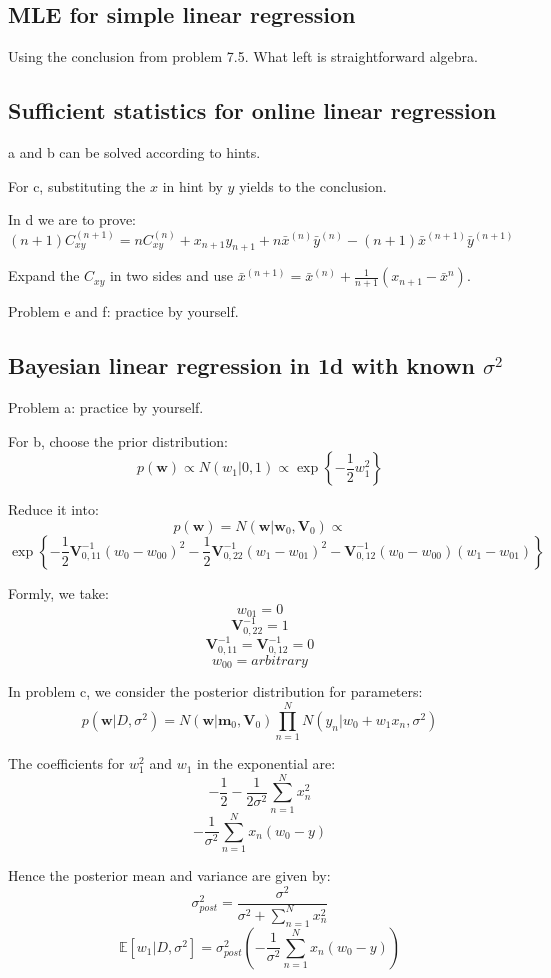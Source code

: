 \documentclass[UTF8]{ctexart}
\begin{document}
\subsection{MLE for simple linear regression}
Using the conclusion from problem 7.5. What left is straightforward algebra.

\subsection{Sufficient statistics for online linear regression}
a and b can be solved according to hints.

For c, substituting the $x$ in hint by $y$ yields to the conclusion.

In d we are to prove:
$$(n+1)C_{xy}^{(n+1)}=nC_{xy}^{(n)}+x_{n+1}y_{n+1}+n\bar{x}^{(n)}\bar{y}^{(n)}-(n+1)\bar{x}^{(n+1)}\bar{y}^{(n+1)}$$

Expand the $C_{xy}$ in two sides and use $\bar{x}^{(n+1)}=\bar{x}^{(n)}+\frac{1}{n+1}(x_{n+1}-\bar{x}^{n})$. 

Problem e and f: practice by yourself.

\subsection{Bayesian linear regression in 1d with known $\sigma^{2}$}
Problem a: practice by yourself.

For b, choose the prior distribution:
$$p(\textbf{w}) \propto N(w_{1}|0,1) \propto \exp\left\{ -\frac{1}{2}w_{1}^{2} \right\}$$

Reduce it into:
$$p(\textbf{w})=N(\textbf{w}|\textbf{w}_{0},\textbf{V}_{0}) \propto $$
$$\exp\left\{ -\frac{1}{2}\textbf{V}_{0,11}^{-1}(w_{0}-w_{00})^{2} - \frac{1}{2}\textbf{V}^{-1}_{0,22}(w_{1}-w_{01})^{2} -\textbf{V}^{-1}_{0,12}(w_{0}-w_{00})(w_{1}-w_{01})\right\}$$

Formly, we take:
$$w_{01}=0$$
$$\textbf{V}_{0,22}^{-1}=1$$
$$\textbf{V}_{0,11}^{-1}=\textbf{V}_{0,12}^{-1}=0$$
$$w_{00}=arbitrary$$

In problem c, we consider the posterior distribution for parameters:
$$p(\textbf{w}|D,\sigma^{2}) =N(\textbf{w}|\textbf{m}_{0},\textbf{V}_{0})\prod_{n=1}^{N}N(y_{n}|w_{0}+w_{1}x_{n},\sigma^{2})$$

The coefficients for $w_{1}^{2}$ and $w_{1}$ in the exponential are:
$$-\frac{1}{2}-\frac{1}{2\sigma^{2}}\sum_{n=1}^{N}x_{n}^{2}$$
$$-\frac{1}{\sigma^{2}}\sum_{n=1}^{N}x_{n}(w_{0}-y)$$

Hence the posterior mean and variance are given by:
$$\sigma^{2}_{post}=\frac{\sigma^{2}}{\sigma^{2}+\sum_{n=1}^{N}x_{n}^{2}}$$
$$\mathbb{E}[w_{1}|D,\sigma^{2}]=\sigma^{2}_{post}(-\frac{1}{\sigma^{2}}\sum_{n=1}^{N}x_{n}(w_{0}-y))$$
\end{document}

